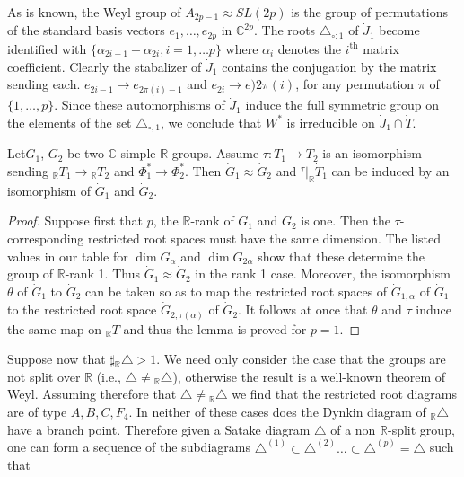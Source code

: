 As is known, the Weyl group of $A_{2 p-1} \approx SL (2p)$ is the
group of permutations of the standard basis vectors $e_1, \ldots ,
e_{2p}$ in $\mathbb{C}^{2p}$. The roots $\triangle_{\circ; 1}$ of
$\dot{J}_1$ become identified with $\{ \alpha_{2i-1}- \alpha_{2i},
i=1, \ldots p\}$ where $\alpha_i$ denotes the $i^{\text{th}}$ matrix
coefficient. Clearly the stabalizer of $\dot{J}_1$ contains the
conjugation by the matrix sending each. $e_{2i-1} \to e_{2 \pi (i)
  -1}$ and $e_{2i} \to e){2 \pi (i)}$, for any permutation $\pi$ of
$\{ 1, \ldots , p\}$. Since these automorphisms of $\dot{J}_1$ induce
the full symmetric group on the elements of the set $\triangle_{\circ,
  1}$, we conclude that $W^*$ is irreducible on $\dot{J}_1 \cap
\dot{T}$.

\begin{lemma} \label{chap6:lem6.4}
  Let\pageoriginale $G_1$, $G_2$ be two $\mathbb{C}$-simple
  $\mathbb{R}$-groups. Assume $\tau : T_1 \to T_2$ is an isomorphism
  sending ${}_{\mathbb{R}} T_1 \to {}_{\mathbb{R}} T_2$ and $\Phi^*_1 \to
  \Phi_2^*$. Then $\dot{G}_1 \approx \dot{G}_2$ and ${}^\tau|_{\mathbb{R}} 
  \dot{T}_1$ can be induced by an isomorphism of $\dot{G}_1$ and $\dot{G}_2$.
\end{lemma}

\begin{proof}
  Suppose first that $p$, the $\mathbb{R}$-rank of $G_1$ and $G_2$ is
  one. Then the $\tau$-corresponding restricted root spaces must have
  the same dimension. The listed values in our table for $\dim
  G_\alpha$ and $\dim G_{2\alpha}$ show that these determine the group
  of $\mathbb{R}$-rank 1. Thus $\dot{G}_1 \approx \dot{G}_2$ in the
  rank 1 case. Moreover, the isomorphism $\theta$ of $\dot{G}_1$ to
  $\dot{G}_2$ can be taken so as to map the restricted root spaces of
  $\dot{G}_{1, \alpha}$ of $\dot{G}_1$ to the restricted root space
  $\dot{G}_{2, \tau (\alpha)}$ of $\dot{G}_2$. It follows at once that
    $\theta$ and $\tau$ induce the same map on ${}_{\mathbb{R}}\dot{T}$ and thus
    the lemma is proved for $p=1$.
\end{proof}

Suppose now that $\sharp {}_\mathbb{R}\triangle > 1$. We need only
consider the case that the groups are not split over $\mathbb{R}$
(i.e., $\triangle \neq {}_\mathbb{R}\triangle$), otherwise the result is
a well-known theorem of Weyl. Assuming therefore that $\triangle \neq
{}_\mathbb{R}\triangle$ we find that the restricted root diagrams are of
type $A, B, C, F_4$. In neither of these cases does the Dynkin diagram
of ${}_\mathbb{R}\triangle$ have a branch point. Therefore given a
Satake diagram $\triangle$ of a non $\mathbb{R}$-split group, one can
form a sequence of the subdiagrams $\triangle^{(1)} \subset
\triangle^{(2)}\ldots \subset \triangle^{(p)} =\triangle$ such that 

